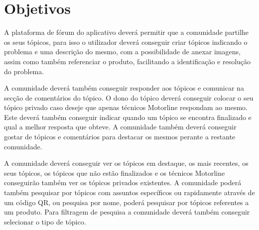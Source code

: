  

 
 


\newpage

\section{Objetivos}
A plataforma de fórum do aplicativo deverá permitir que a comunidade partilhe os seus tópicos, para 
isso o utilizador deverá conseguir criar tópicos indicando o problema e uma descrição do mesmo, 
com a possibilidade de anexar imagens, assim como também referenciar 
o produto, facilitando a identificação e resolução do problema.

A comunidade deverá também conseguir responder aos tópicos e comunicar na secção de comentários do tópico. 
O dono do tópico deverá conseguir colocar o seu tópico privado caso deseje que apenas técnicos Motorline 
respondam ao mesmo. Este deverá também conseguir indicar quando um tópico se encontra finalizado e qual a 
melhor resposta que obteve. A comunidade também deverá conseguir gostar de tópicos e comentários para 
destacar os mesmos perante a restante comunidade.

A comunidade deverá conseguir ver os tópicos em destaque, os mais recentes, os seus tópicos, os tópicos 
que não estão finalizados e os técnicos Motorline conseguirão também ver os tópicos privados existentes. 
A comunidade poderá também pesquisar por tópicos com assuntos específicos ou rapidamente através de 
um código QR, ou pesquisa por nome, poderá pesquisar por tópicos referentes a um produto. Para filtragem 
de pesquisa a comunidade deverá também conseguir selecionar o tipo de tópico.

